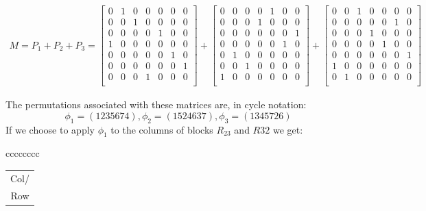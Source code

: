 \documentclass[
  12pt,
  a4paper]{book}
\begin{document}
\[\begin{gathered}
M= P_1 + P_2 + P_3 = 
  \begin{bmatrix}
  0 & 1 & 0 & 0 & 0 & 0 & 0\\
  0 & 0 & 1 & 0 & 0 & 0 & 0\\
  0 & 0 & 0 & 0 & 1 & 0 & 0\\
  1 & 0 & 0 & 0 & 0 & 0 & 0\\
  0 & 0 & 0 & 0 & 0 & 1 & 0\\
  0 & 0 & 0 & 0 & 0 & 0 & 1\\
  0 & 0 & 0 & 1 & 0 & 0 & 0\\
  \end{bmatrix}
  +
  \begin{bmatrix}
  0 & 0 & 0 & 0 & 1 & 0 & 0\\
  0 & 0 & 0 & 1 & 0 & 0 & 0\\
  0 & 0 & 0 & 0 & 0 & 0 & 1\\
  0 & 0 & 0 & 0 & 0 & 1 & 0\\
  0 & 1 & 0 & 0 & 0 & 0 & 0\\
  0 & 0 & 1 & 0 & 0 & 0 & 0\\
  1 & 0 & 0 & 0 & 0 & 0 & 0\\
  \end{bmatrix}
  +
  \begin{bmatrix}
  0 & 0 & 1 & 0 & 0 & 0 & 0\\
  0 & 0 & 0 & 0 & 0 & 1 & 0\\
  0 & 0 & 0 & 1 & 0 & 0 & 0\\
  0 & 0 & 0 & 0 & 1 & 0 & 0\\
  0 & 0 & 0 & 0 & 0 & 0 & 1\\
  1 & 0 & 0 & 0 & 0 & 0 & 0\\
  0 & 1 & 0 & 0 & 0 & 0 & 0\\
  \end{bmatrix}\end{gathered}\]

The permutations associated with these matrices are, in cycle notation:
\[\phi _1 = (1235674), \phi _2 = (1524637), \phi _3 = (1345726)\] If we
choose to apply \(\phi _1\) to the columns of blocks \(R_{23}\) and \(R{32}\)
we get:

{\textbar c\textbar c\textbar c\textbar c\textbar c\textbar c\textbar c\textbar c\textbar{}}

\begin{longtable}[]{@{}c@{}}
\toprule
\endhead
Col/\tabularnewline
Row\tabularnewline
\bottomrule
\end{longtable}
\end{document}
